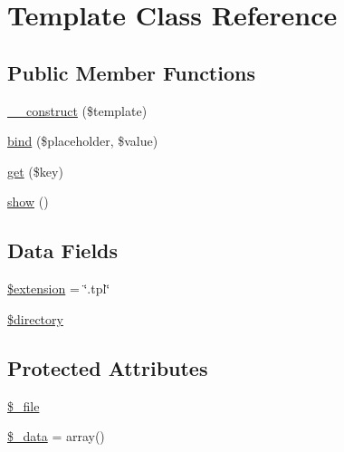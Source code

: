 \hypertarget{class_template}{\section{Template Class Reference}
\label{class_template}
}
\subsection*{Public Member Functions}
\begin{DoxyCompactItemize}
\item 
\hyperlink{class_template_af2deef993b5bb3c209fae5f994f3ebae}{\-\_\-\-\_\-construct} (\$template)
\item 
\hyperlink{class_template_a820993178e7ede5e791288b36b9cef57}{bind} (\$placeholder, \$value)
\item 
\hyperlink{class_template_a24a9bf83a1002d46ece83a93d14bd921}{get} (\$key)
\item 
\hyperlink{class_template_a2b8e3779f5bd8c38f70307574859bd36}{show} ()
\end{DoxyCompactItemize}
\subsection*{Data Fields}
\begin{DoxyCompactItemize}
\item 
\hyperlink{class_template_aed02cd2cd0ee08bd99a2ac1ef4f955ce}{\$extension} = \char`\"{}.tpl\char`\"{}
\item 
\hyperlink{class_template_a1b07c630eb02f770a082a013373a16d6}{\$directory}
\end{DoxyCompactItemize}
\subsection*{Protected Attributes}
\begin{DoxyCompactItemize}
\item 
\hyperlink{class_template_abddaf0b77086e2b7d920f5d1a9616889}{\$\-\_\-file}
\item 
\hyperlink{class_template_a5a3006290f2de94fff2dd63ca739d15a}{\$\-\_\-data} = array()
\end{DoxyCompactItemize}


